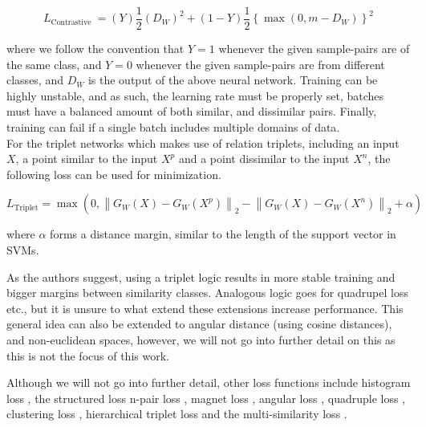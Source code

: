 \documentclass[a4paper,12pt,twoside,openright]{report}
\begin{document}
\begin{equation}
L_{\text {Contrastive }}=(Y) \frac{1}{2}\left(D_{W}\right)^{2}+(1-Y) \frac{1}{2}\left\{\max \left(0, m-D_{W}\right)\right\}^{2}
\end{equation}

where we follow the convention that $Y=1$ whenever the given sample-pairs are of the same class, and $Y=0$ whenever the given sample-pairs are from different classes, and $D_W$ is the output of the above neural network.
Training can be highly unstable, and as such, the learning rate must be properly set, batches must have a balanced amount of both similar, and dissimilar pairs. 
Finally, training can fail if a single batch includes multiple domains of data. \\

For the triplet networks \cite{hoffer14} which makes use of relation triplets, including an input $X$, a point similar to the input $X^p$ and a point dissimilar to the input $X^n$, the following loss can be used for minimization.

\begin{equation}
L_{\text {Triplet}}=\max \left(0,\left\|G_{W}(X)-G_{W}\left(X^{p}\right)\right\|_{2}-\left\|G_{W}(X)-G_{W}\left(X^{n}\right)\right\|_{2}+\alpha\right)
\end{equation} 

where $\alpha$ forms a distance margin, similar to the length of the support vector in SVMs.

As the authors suggest, using a triplet logic results in more stable training and bigger margins between similarity classes.
Analogous logic goes for quadrupel loss etc., but it is unsure to what extend these extensions increase performance.
This general idea can also be extended to angular distance (using cosine distances), and non-euclidean spaces, however, we will not go into further detail on this as this is not the focus of this work.

Although we will not go into further detail, other loss functions include histogram loss \cite{ustinova16}, the structured loss \cite{song16} n-pair loss \cite{sohn16}, magnet loss \cite{rippel16}, angular loss \cite{wang17}, quadruple loss \cite{ni17}, clustering loss \cite{song17}, hierarchical triplet loss \cite{ge18} and the multi-similarity loss \cite{wang19c}.

\end{document}
